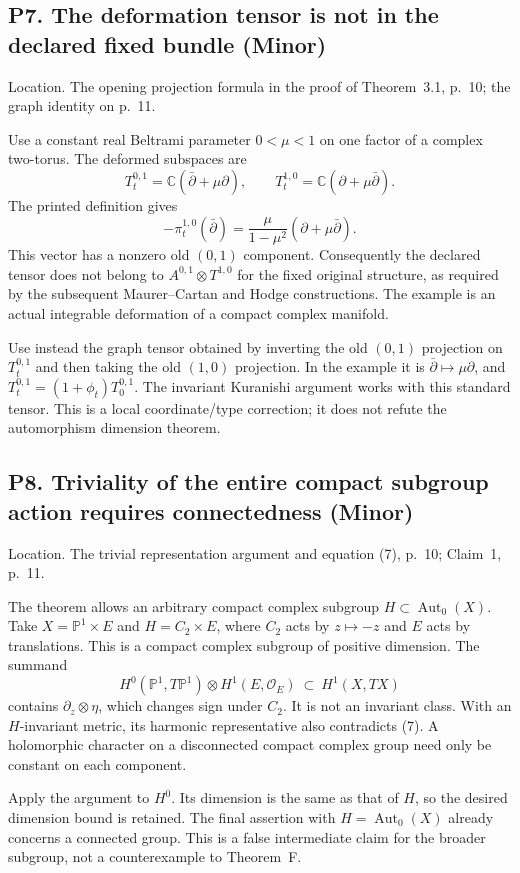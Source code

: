 \documentclass[10pt]{article}
\begin{document}
\subsection*{P7. The deformation tensor is not in the declared fixed bundle (Minor)}
Location. The opening projection formula in the proof of Theorem 3.1, p. 10; the graph identity on p. 11.\par
Use a constant real Beltrami parameter \(0<\mu<1\) on one factor of a complex two-torus. The deformed subspaces are \[T_t^{0,1}=\mathbb C(\bar\partial+\mu\partial),\qquad
 T_t^{1,0}=\mathbb C(\partial+\mu\bar\partial).\] The printed definition gives \[-\pi_t^{1,0}(\bar\partial)
   =\frac{\mu}{1-\mu^2}
                    (\partial+\mu\bar\partial).\] This vector has a nonzero old \((0,1)\) component. Consequently the declared tensor does not belong to \(A^{0,1}\otimes T^{1,0}\) for the fixed original structure, as required by the subsequent Maurer–Cartan and Hodge constructions. The example is an actual integrable deformation of a compact complex manifold.\par
Use instead the graph tensor obtained by inverting the old \((0,1)\) projection on \(T_t^{0,1}\) and then taking the old \((1,0)\) projection. In the example it is \(\bar\partial\mapsto\mu\partial\), and \(T_t^{0,1}=(1+\phi_t)T_0^{0,1}\). The invariant Kuranishi argument works with this standard tensor. This is a local coordinate/type correction; it does not refute the automorphism dimension theorem.\par
\subsection*{P8. Triviality of the entire compact subgroup action requires connectedness (Minor)}
Location. The trivial representation argument and equation (7), p. 10; Claim 1, p. 11.\par
The theorem allows an arbitrary compact complex subgroup \(H\subset\operatorname{Aut}_0(X)\). Take \(X=\mathbb P^1\times E\) and \(H=C_2\times E\), where \(C_2\) acts by \(z\mapsto-z\) and \(E\) acts by translations. This is a compact complex subgroup of positive dimension. The summand \[H^0(\mathbb P^1,T\mathbb P^1)\otimes H^1(E,\mathcal O_E)
       \ \subset\ H^1(X,TX)\] contains \(\partial_z\otimes\eta\), which changes sign under \(C_2\). It is not an invariant class. With an \(H\)-invariant metric, its harmonic representative also contradicts (7). A holomorphic character on a disconnected compact complex group need only be constant on each component.\par
Apply the argument to \(H^0\). Its dimension is the same as that of \(H\), so the desired dimension bound is retained. The final assertion with \(H=\operatorname{Aut}_0(X)\) already concerns a connected group. This is a false intermediate claim for the broader subgroup, not a counterexample to Theorem F.\par
\end{document}
